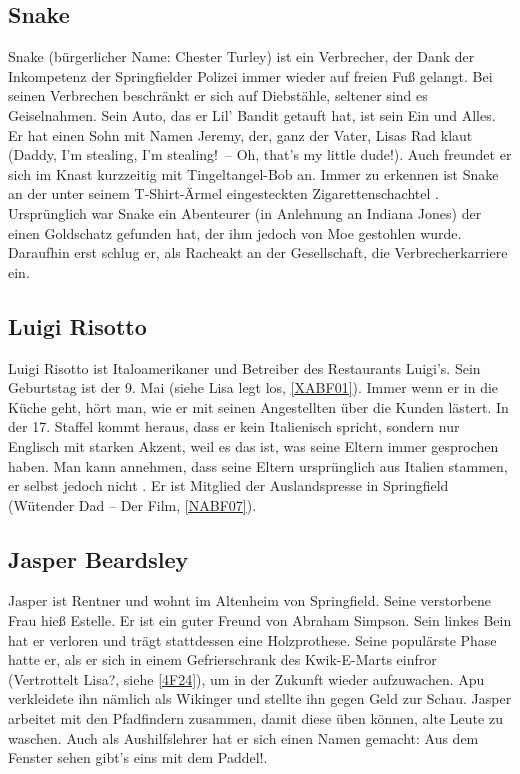 {\subsection{Snake}\label{Snake}
Snake (bürgerlicher Name: Chester Turley) ist ein Verbrecher, der Dank der Inkompetenz der Springfielder Polizei immer wieder auf freien Fuß gelangt. Bei seinen Verbrechen beschränkt er sich auf Diebstähle, seltener sind es Geiselnahmen. Sein Auto, das er Lil' Bandit getauft hat, ist sein Ein und Alles. Er hat einen Sohn mit Namen Jeremy, der, ganz der Vater, Lisas Rad klaut (\glqq Daddy, I'm stealing, I'm stealing!\grqq\ -- \glqq Oh, that's my little dude!\grqq ). Auch freundet er sich im Knast kurzzeitig mit Tingeltangel-Bob an. Immer zu erkennen ist Snake an der unter seinem T-Shirt-Ärmel eingesteckten Zigarettenschachtel \cite{Wikipedia}. Ursprünglich war Snake ein Abenteurer (in Anlehnung an Indiana Jones) der einen Goldschatz gefunden hat, der ihm jedoch von Moe gestohlen wurde. Daraufhin erst schlug er, als Racheakt an der Gesellschaft, die Verbrecherkarriere ein.


\subsection{Luigi Risotto}\label{LuigiRisotto}
Luigi Risotto ist Italoamerikaner und Betreiber des Restaurants Luigi's. Sein Geburtstag ist der 9. Mai (siehe \glqq Lisa legt los\grqq, \ref{XABF01}). Immer wenn er in die Küche geht, hört man, wie er mit seinen Angestellten über die Kunden lästert. In der 17. Staffel kommt heraus, dass er kein Italienisch spricht, sondern nur Englisch mit starken Akzent, weil es das ist, was seine Eltern immer gesprochen haben. Man kann annehmen, dass seine Eltern ursprünglich aus Italien stammen, er selbst jedoch nicht \cite{Wikipedia}. Er ist Mitglied der Auslandspresse in Springfield (\glqq Wütender Dad -- Der Film\grqq , \ref{NABF07}).

\subsection{Jasper Beardsley}\label{JasperBeardsley}
Jasper ist Rentner und wohnt im Altenheim von Springfield. Seine verstorbene Frau hieß Estelle. Er ist ein guter Freund von Abraham Simpson. Sein linkes Bein hat er verloren und trägt stattdessen eine Holzprothese. Seine populärste Phase hatte er, als er sich in einem Gefrierschrank des Kwik-E-Marts einfror (\glqq Vertrottelt Lisa?\grqq , siehe \ref{4F24}), um in der Zukunft wieder aufzuwachen. Apu verkleidete ihn nämlich als Wikinger und stellte ihn gegen Geld zur Schau. Jasper arbeitet mit den Pfadfindern zusammen, damit diese üben können, alte Leute zu waschen. Auch als Aushilfslehrer hat er sich einen Namen gemacht: \glqq Aus dem Fenster sehen gibt's eins mit dem Paddel!\grqq .

}
